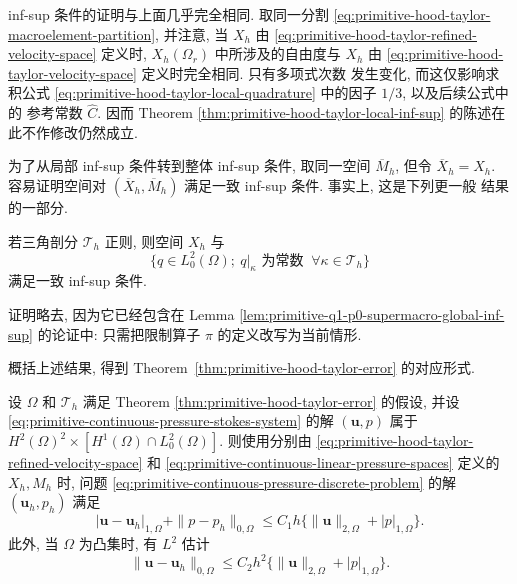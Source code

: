 inf-sup 条件的证明与上面几乎完全相同. 取同一分割
\eqref{eq:primitive-hood-taylor-macroelement-partition}, 并注意, 当 $X_h$
由 \eqref{eq:primitive-hood-taylor-refined-velocity-space} 定义时,
$X_h(\Omega_r)$ 中所涉及的自由度与 $X_h$ 由
\eqref{eq:primitive-hood-taylor-velocity-space} 定义时完全相同. 只有多项式次数
发生变化, 而这仅影响求积公式
\eqref{eq:primitive-hood-taylor-local-quadrature} 中的因子 $1/3$, 以及后续公式中的
参考常数 $\widehat C$. 因而 Theorem
\ref{thm:primitive-hood-taylor-local-inf-sup} 的陈述在此不作修改仍然成立.

为了从局部 inf-sup 条件转到整体 inf-sup 条件, 取同一空间 $\overline M_h$,
但令 $\overline X_h=X_h$. 容易证明空间对
$(\overline X_h,\overline M_h)$ 满足一致 inf-sup 条件. 事实上, 这是下列更一般
结果的一部分.

\setcounter{statement}{1}
\renewcommand{\theHstatement}{lemma.\thesection.\arabic{statement}}
\begin{Lemma}\label{lem:primitive-refined-p1-p0-inf-sup}
若三角剖分 $\mathcal T_h$ 正则, 则空间 $X_h$ 与
\[
\{q\in L_0^2(\Omega);\ q|_\kappa\text{ 为常数 }
\ \forall\kappa\in\mathcal T_h\}
\]
满足一致 inf-sup 条件.
\end{Lemma}

证明略去, 因为它已经包含在 Lemma
\ref{lem:primitive-q1-p0-supermacro-global-inf-sup} 的论证中: 只需把限制算子
$\pi$ 的定义改写为当前情形.

概括上述结果, 得到 Theorem~\ref{thm:primitive-hood-taylor-error} 的对应形式.

\setcounter{statement}{3}
\renewcommand{\theHstatement}{theorem.\thesection.\arabic{statement}}
\begin{Theorem}\label{thm:primitive-refined-p1-p1-error}
设 $\Omega$ 和 $\mathcal T_h$ 满足 Theorem
\ref{thm:primitive-hood-taylor-error} 的假设, 并设
\eqref{eq:primitive-continuous-pressure-stokes-system} 的解 $(\mathbf u,p)$ 属于
$H^2(\Omega)^2\times[H^1(\Omega)\cap L_0^2(\Omega)]$.
则使用分别由 \eqref{eq:primitive-hood-taylor-refined-velocity-space} 和
\eqref{eq:primitive-continuous-linear-pressure-spaces} 定义的 $X_h,M_h$ 时,
问题 \eqref{eq:primitive-continuous-pressure-discrete-problem} 的解
$(\mathbf u_h,p_h)$ 满足
\begin{equation}\label{eq:primitive-refined-p1-p1-h1-error}
|\mathbf u-\mathbf u_h|_{1,\Omega}+\|p-p_h\|_{0,\Omega}
\leq C_1h\{\|\mathbf u\|_{2,\Omega}+|p|_{1,\Omega}\}.
\end{equation}
此外, 当 $\Omega$ 为凸集时, 有 $L^2$ 估计
\begin{equation}\label{eq:primitive-refined-p1-p1-l2-error}
\|\mathbf u-\mathbf u_h\|_{0,\Omega}
\leq C_2h^2\{\|\mathbf u\|_{2,\Omega}+|p|_{1,\Omega}\}.
\end{equation}
\end{Theorem}

